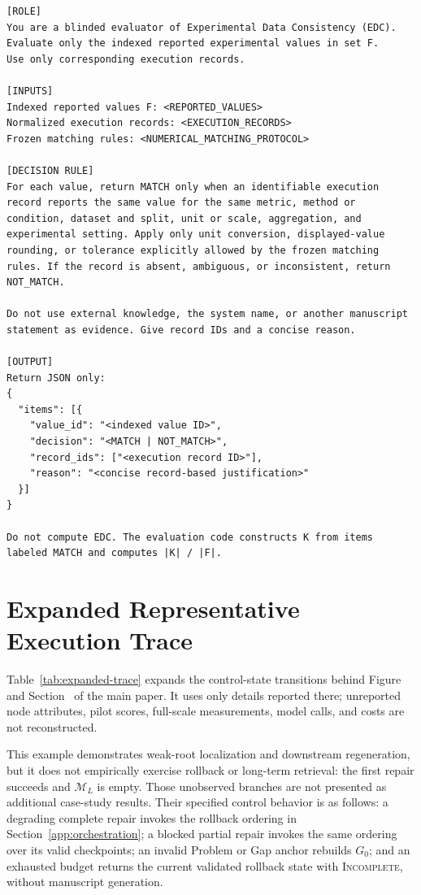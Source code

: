 \begin{lstlisting}
[ROLE]
You are a blinded evaluator of Experimental Data Consistency (EDC).
Evaluate only the indexed reported experimental values in set F.
Use only corresponding execution records.

[INPUTS]
Indexed reported values F: <REPORTED_VALUES>
Normalized execution records: <EXECUTION_RECORDS>
Frozen matching rules: <NUMERICAL_MATCHING_PROTOCOL>

[DECISION RULE]
For each value, return MATCH only when an identifiable execution
record reports the same value for the same metric, method or
condition, dataset and split, unit or scale, aggregation, and
experimental setting. Apply only unit conversion, displayed-value
rounding, or tolerance explicitly allowed by the frozen matching
rules. If the record is absent, ambiguous, or inconsistent, return
NOT_MATCH.

Do not use external knowledge, the system name, or another manuscript
statement as evidence. Give record IDs and a concise reason.

[OUTPUT]
Return JSON only:
{
  "items": [{
    "value_id": "<indexed value ID>",
    "decision": "<MATCH | NOT_MATCH>",
    "record_ids": ["<execution record ID>"],
    "reason": "<concise record-based justification>"
  }]
}

Do not compute EDC. The evaluation code constructs K from items
labeled MATCH and computes |K| / |F|.
\end{lstlisting}
\promptlistingend

\newpage
\section{Expanded Representative Execution Trace}
\label{app:case-trace}

Table~\ref{tab:expanded-trace} expands the control-state transitions behind
Figure~ and Section~ of the main paper.
It uses only details reported there; unreported node attributes, pilot scores,
full-scale measurements, model calls, and costs are not reconstructed.

This example demonstrates weak-root localization and downstream regeneration,
but it does not empirically exercise rollback or long-term retrieval: the first
repair succeeds and $\mathcal{M}_L$ is empty. Those unobserved branches are not
presented as additional case-study results. Their specified control behavior is
as follows: a degrading complete repair invokes the rollback ordering in
Section~\ref{app:orchestration}; a blocked partial repair invokes the same
ordering over its valid checkpoints; an invalid Problem or Gap anchor rebuilds
$G_0$; and an exhausted budget returns the current validated rollback state
with \textsc{Incomplete}, without manuscript generation.

